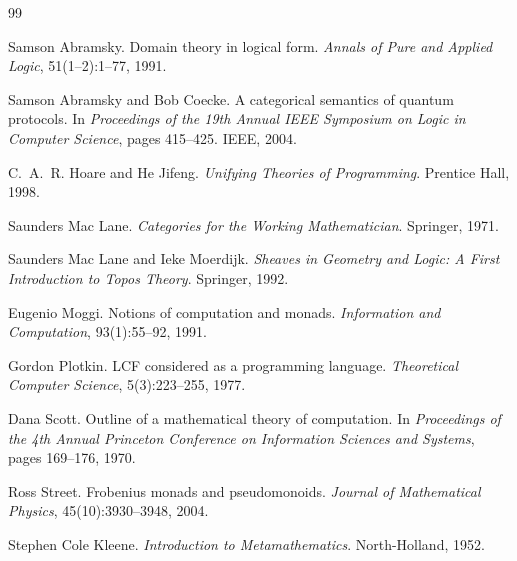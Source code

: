 \documentclass[11pt,a4paper]{article}
\theoremstyle{definition}
\begin{document}
\begin{thebibliography}{99}

Samson Abramsky.
\newblock Domain theory in logical form.
\newblock \emph{Annals of Pure and Applied Logic}, 51(1--2):1--77, 1991.

Samson Abramsky and Bob Coecke.
\newblock A categorical semantics of quantum protocols.
\newblock In \emph{Proceedings of the 19th Annual IEEE Symposium on
  Logic in Computer Science}, pages 415--425. IEEE, 2004.

C.~A.~R. Hoare and He Jifeng.
\newblock \emph{Unifying Theories of Programming}.
\newblock Prentice Hall, 1998.

Saunders Mac Lane.
\newblock \emph{Categories for the Working Mathematician}.
\newblock Springer, 1971.

Saunders Mac Lane and Ieke Moerdijk.
\newblock \emph{Sheaves in Geometry and Logic:
  A First Introduction to Topos Theory}.
\newblock Springer, 1992.

Eugenio Moggi.
\newblock Notions of computation and monads.
\newblock \emph{Information and Computation}, 93(1):55--92, 1991.

Gordon Plotkin.
\newblock LCF considered as a programming language.
\newblock \emph{Theoretical Computer Science}, 5(3):223--255, 1977.

Dana Scott.
\newblock Outline of a mathematical theory of computation.
\newblock In \emph{Proceedings of the 4th Annual Princeton Conference
  on Information Sciences and Systems}, pages 169--176, 1970.

Ross Street.
\newblock Frobenius monads and pseudomonoids.
\newblock \emph{Journal of Mathematical Physics},
  45(10):3930--3948, 2004.

Stephen Cole Kleene.
\newblock \emph{Introduction to Metamathematics}.
\newblock North-Holland, 1952.

\end{thebibliography}
\end{document}
